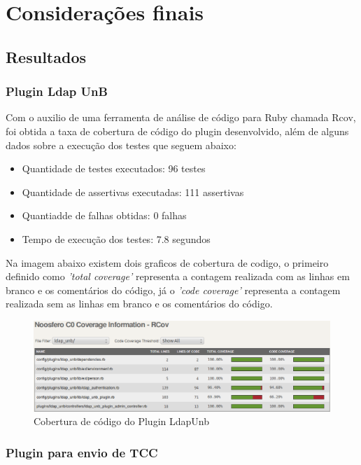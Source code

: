 \chapter{Considerações finais}
\label{consideracoes-finais}


\section{Resultados}
\label{results}

\subsection{Plugin Ldap UnB}

Com o auxilio de uma ferramenta de análise de código para Ruby chamada Rcov, foi obtida a taxa de cobertura de código do plugin desenvolvido, além de alguns dados sobre a execução dos testes que seguem abaixo:

\begin{itemize}
\item Quantidade de testes executados: 96 testes
\item Quantidade de assertivas executadas: 111 assertivas
\item Quantiadde de falhas obtidas: 0 falhas
\item Tempo de execução dos testes: 7.8 segundos
\end{itemize}
%
Na imagem abaixo existem dois graficos de cobertura de codigo, o primeiro definido como \textit{'total coverage'} representa a contagem realizada com as linhas em branco e os comentários do código, já o \textit{'code coverage'} representa a contagem realizada sem as linhas em branco e os comentários do código.
%
\begin{figure}[!h]
    \centering
    \includegraphics[keepaspectratio=false,scale=0.45]
      {figuras/cobertura_teste.eps}
    \caption{Cobertura de código do Plugin LdapUnb}
    \label{noosfero_bug}
\end{figure}
%

\subsection{Plugin para envio de TCC}

